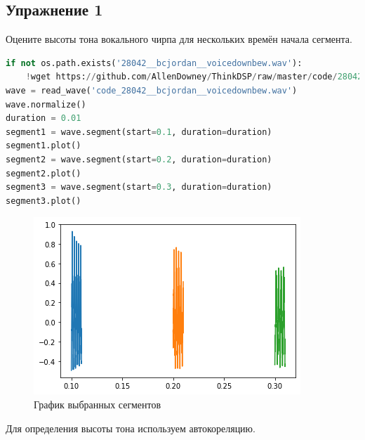 \subsection{Упражнение 1}

Оцените высоты тона вокального чирпа для нескольких времён начала сегмента.

\begin{lstlisting}[language=Python]
if not os.path.exists('28042__bcjordan__voicedownbew.wav'):
    !wget https://github.com/AllenDowney/ThinkDSP/raw/master/code/28042__bcjordan__voicedownbew.wav
wave = read_wave('code_28042__bcjordan__voicedownbew.wav')
wave.normalize()
duration = 0.01
segment1 = wave.segment(start=0.1, duration=duration)
segment1.plot()
segment2 = wave.segment(start=0.2, duration=duration)
segment2.plot()
segment3 = wave.segment(start=0.3, duration=duration)
segment3.plot()
\end{lstlisting}
\begin{figure}[H]
	\begin{center}
		\includegraphics[scale=1]{fig/lab05/lab05_5_0.png}
		\caption{График выбранных сегментов}
	\end{center}
\end{figure}

Для определения высоты тона используем автокореляцию.


